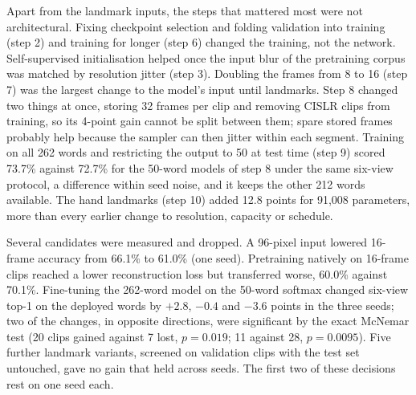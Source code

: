 \documentclass[pdflatex,sn-mathphys-num,twocolumn]{sn-jnl}
\theoremstyle{thmstyleone}%
\begin{document}
\begin{appendices}
Apart from the landmark inputs, the steps that mattered most were not architectural. Fixing checkpoint selection and folding validation into training (step 2) and training for longer (step 6) changed the training, not the network. Self-supervised initialisation helped once the input blur of the pretraining corpus was matched by resolution jitter (step 3). Doubling the frames from 8 to 16 (step 7) was the largest change to the model's input until landmarks. Step 8 changed two things at once, storing 32 frames per clip and removing CISLR clips from training, so its 4-point gain cannot be split between them; spare stored frames probably help because the sampler can then jitter within each segment. Training on all 262 words and restricting the output to 50 at test time (step 9) scored 73.7\% against 72.7\% for the 50-word models of step 8 under the same six-view protocol, a difference within seed noise, and it keeps the other 212 words available. The hand landmarks (step 10) added 12.8 points for 91,008 parameters, more than every earlier change to resolution, capacity or schedule.

Several candidates were measured and dropped. A 96-pixel input lowered 16-frame accuracy from 66.1\% to 61.0\% (one seed). Pretraining natively on 16-frame clips reached a lower reconstruction loss but transferred worse, 60.0\% against 70.1\%. Fine-tuning the 262-word model on the 50-word softmax changed six-view top-1 on the deployed words by $+2.8$, $-0.4$ and $-3.6$ points in the three seeds; two of the changes, in opposite directions, were significant by the exact McNemar test (20 clips gained against 7 lost, $p=0.019$; 11 against 28, $p=0.0095$). Five further landmark variants, screened on validation clips with the test set untouched, gave no gain that held across seeds. The first two of these decisions rest on one seed each.

\end{appendices}


\end{document}
